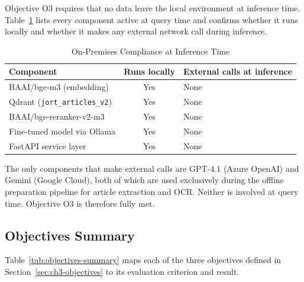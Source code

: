 Objective O3 requires that no data leave the local environment at inference time. Table~\ref{tab:onpremises} lists every component active at query time and confirms whether it runs locally and whether it makes any external network call during inference.

\begin{table}[H]
\centering
\caption{On-Premises Compliance at Inference Time}
\label{tab:onpremises}
\renewcommand{\arraystretch}{1.3}
\begin{tabular}{|p{4.5cm}|c|p{5.5cm}|}
\hline
\textbf{Component} & \textbf{Runs locally} & \textbf{External calls at inference} \\
\hline
BAAI/bge-m3 (embedding) & Yes & None \\
\hline
Qdrant (\texttt{jort\_articles\_v2}) & Yes & None \\
\hline
BAAI/bge-reranker-v2-m3 & Yes & None \\
\hline
Fine-tuned model via Ollama & Yes & None \\
\hline
FastAPI service layer & Yes & None \\
\hline
\end{tabular}
\end{table}

The only components that make external calls are GPT-4.1 (Azure OpenAI) and Gemini (Google Cloud), both of which are used exclusively during the offline preparation pipeline for article extraction and \ac{OCR}. Neither is involved at query time. Objective O3 is therefore fully met.

\subsection{Objectives Summary}
\label{subsec:ch4-objectives-summary}

Table~\ref{tab:objectives-summary} maps each of the three objectives defined in Section~\ref{sec:ch3-objectives} to its evaluation criterion and result.

